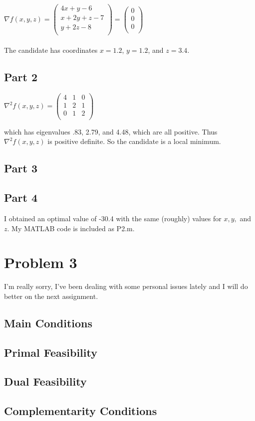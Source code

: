 \documentclass{article}
\begin{document}
$\nabla f(x,y,z) = 
\left( \begin{array}{c}
     4x + y - 6\\
     x + 2y + z - 7\\
     y + 2z - 8\\
\end{array} \right) = 
\left( \begin{array}{c}
     0\\
     0\\
     0\\
\end{array} \right)$
\\\\
The candidate has coordinates $x = 1.2$, $y = 1.2$, and $z = 3.4$.

\subsection{Part 2}

$\nabla^2 f(x,y,z) = 
\left( \begin{array}{ccc}
    4 & 1 & 0\\
    1 & 2 & 1\\
    0 & 1 & 2\\
\end{array} \right)$

which has eigenvalues .83, 2.79, and 4.48, which are all positive. Thus $\nabla^2 f(x,y,z)$ is positive definite. So the candidate is a local minimum. 

\subsection{Part 3}



\subsection{Part 4}

I obtained an optimal value of -30.4 with the same (roughly) values for $x, y,$ and $z$. My MATLAB code is included as P2.m.

\section{Problem 3}

I'm really sorry, I've been dealing with some personal issues lately and I will do better on the next assignment.

\subsection{Main Conditions}

\subsection{Primal Feasibility}

\subsection{Dual Feasibility}

\subsection{Complementarity Conditions}
\end{document}

